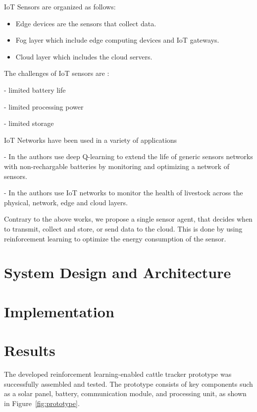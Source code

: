 \documentclass[10pt]{cai}
\begin{document}
IoT Sensors are organized as follows:
\begin{itemize}

\item Edge devices are the sensors that collect data.
\item Fog layer which include edge computing devices and IoT gateways.
\item Cloud layer which includes the cloud servers.
\end{itemize}

The challenges of IoT sensors are \cite{chenDeepReinforcementLearning2021}:

- limited battery life

- limited processing power

- limited storage


IoT Networks have been used in a variety of applications

- In \cite{hribarUsingDeepQLearning2019} the authors use deep Q-learning to extend the life of generic sensors networks with non-rechargable batteries by monitoring and optimizing a network of sensors.

- In \cite{yamsaniIoTBasedLivestockMonitoring2024} the authors use IoT networks to monitor the health of livestock across the physical, network, edge and cloud layers.

Contrary to the above works, we propose a single sensor agent, that decides when to transmit, collect and store, or send data to the cloud. This is done by using reinforcement learning to optimize the energy consumption of the sensor.

\section{System Design and Architecture}

\section{Implementation}

\section{Results}

The developed reinforcement learning-enabled cattle tracker prototype was successfully assembled and tested. The prototype consists of key components such as a solar panel, battery, communication module, and processing unit, as shown in Figure~\ref{fig:prototype}.
\end{document}
